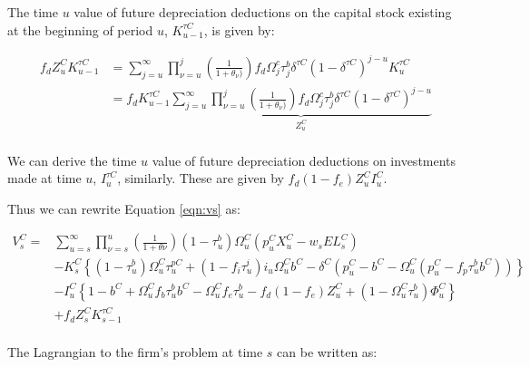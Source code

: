 The time $u$ value of future depreciation deductions on the capital stock existing at the beginning of period $u$, $K^{\tau C}_{u-1}$, is given by: 

\begin{equation}
\label{eqn:z}
\begin{split}
f_{d}Z^{C}_{u}K^{\tau C}_{u-1} &=  \sum^{\infty}_{j=u} \prod_{\nu=u}^{j} \left(\frac{1}{1+\theta_{\nu})}\right)f_{d}\Omega^{c}_{j}\tau^{b}_{j}\delta^{\tau C}(1-\delta^{\tau C})^{j-u}K^{\tau C}_{u} \\
&= f_{d} K^{\tau C}_{u-1} \underbrace{\sum^{\infty}_{j=u} \prod_{\nu=u}^{j} \left(\frac{1}{1+\theta_{\nu})}\right)f_{d}\Omega^{c}_{j}\tau^{b}_{j}\delta^{\tau C}(1-\delta^{\tau C})^{j-u}}_{Z^{C}_{u}} \\
\end{split}
\end{equation}

We can derive the time $u$ value of future depreciation deductions on investments made at time $u$, $I^{\tau C}_{u}$, similarly.  These are given by $f_{d}(1-f_{e})Z^{C}_{u}I^{C}_{u}$.

Thus we can rewrite Equation \ref{eqn:vs} as: 

 \begin{equation}
\label{eqn:vs_w_z}
\begin{split}
V^{C}_{s} = &  \sum_{u=s}^{\infty} \prod_{\nu=s}^{u}\left(\frac{1}{1+\theta{\nu}}\right) (1-\tau^{b}_{u})\Omega^{C}_{u}(p^{C}_{u}X^{C}_{u}-w_{s}EL^{C}_{s})  \\ 
 & - K^{C}_{s} \left\{(1-\tau^{b}_{u})\Omega^{C}_{u}\tau^{pC}_{u}+(1-f_{i}\tau^{i}_{u})i_{u}\Omega^{C}_{u}b^{C}-\delta^{C}(p^{C}_{u}-b^{C}-\Omega^{C}_{u}(p^{C}_{u}-f_{p}\tau^{b}_{u}b^{C}))\right\}  \\
 & - I^{C}_{u}\left\{1-b^{C}+\Omega^{C}_{u}f_{b}\tau^{b}_{u}b^{C}-\Omega^{C}_{u}f_{e}\tau^{b}_{u} - f_{d}(1-f_{e})Z^{C}_{u} + (1-\Omega^{C}_{u}\tau^{b}_{u})\Phi^{C}_{u}\right\} \\
 &  + f_{d}Z^{C}_{s}K^{\tau C}_{s-1} \\
\end{split}
\end{equation}


The Lagrangian to the firm's problem at time $s$ can be written as:

